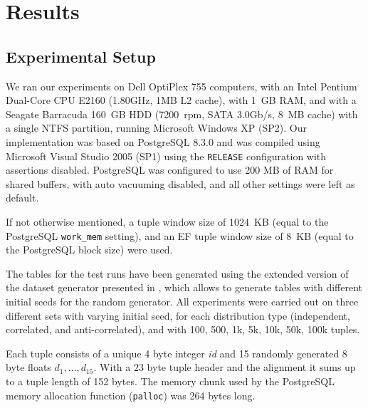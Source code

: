 


\chapter{Results}
\label{chap:results}


\section{Experimental Setup}
We ran our experiments on Dell OptiPlex 755 computers, with an Intel Pentium
Dual-Core CPU E2160 (1.80GHz, 1MB L2 cache), with 1~GB RAM, and with a Seagate
Barracuda 160~GB HDD (7200~rpm, SATA 3.0Gb/s, 8~MB cache) with a
single NTFS partition,
running Microsoft Windows XP (SP2).
% 
Our implementation was based on PostgreSQL 8.3.0 and was compiled
using Microsoft Visual Studio 2005 (SP1) using the \texttt{RELEASE}
configuration with assertions disabled.
%
PostgreSQL was configured to use 200 MB of RAM for shared buffers,
with auto vacuuming disabled, and all other settings were left as
default.

If not otherwise mentioned, a tuple window size of 1024~KB (equal to
the PostgreSQL \texttt{work\_mem} setting), and an EF tuple window
size of 8~KB (equal to the PostgreSQL block size) were used.

The tables for the test runs have been generated using the extended
version \citep{Eder2007a} of the dataset generator presented in
\citep{Borzsonyi2001}, which allows to generate tables with
different initial seeds for the random generator. All experiments
were carried out on three different sets with varying initial seed, for each
distribution type (independent, correlated, and anti-correlated), and
with 100, 500, 1k, 5k, 10k, 50k, 100k tuples.

Each tuple consists of a unique 4 byte integer \emph{id} and 15
randomly generated 8 byte floats $d_1, \ldots, d_{15}$. With a 23 byte
tuple header and the alignment it sums up to a tuple length of 152 bytes. 
The memory chunk used by the PostgreSQL memory allocation function
(\texttt{palloc}) was 264 bytes long.
%
%
%
%
%


